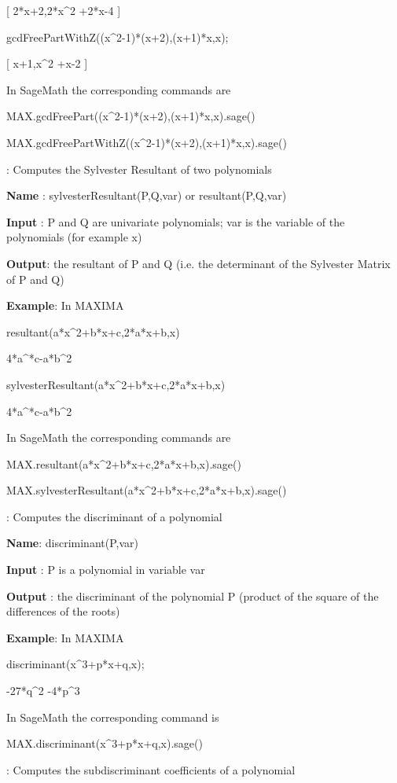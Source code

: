 \documentclass{article}
\begin{document}
   [ 2*x+2,2*x\^{}{2} +2*x-4 ]
   
 gcdFreePartWithZ((x\^{}2-1)*(x+2),(x+1)*x,x);
 
 [ x+1,x\^{}{2} +x-2 ]
  
  \noindent In SageMath the corresponding commands are 
  
  MAX.gcdFreePart((x\^{}2-1)*(x+2),(x+1)*x,x).sage()
  
    MAX.gcdFreePartWithZ((x\^{}2-1)*(x+2),(x+1)*x,x).sage()
  
: Computes the Sylvester Resultant of two polynomials
  
 {\bf Name} : sylvesterResultant(P,Q,var) or
  resultant(P,Q,var)
  
 {\bf Input} : P and Q are univariate polynomials; var is the variable of the polynomials (for example x)
  
  {\bf Output}: the resultant of P and Q (i.e. the determinant of the Sylvester
  Matrix of P and Q)
  
 {\bf Example}: In MAXIMA
 
 resultant(a*x\^{}2+b*x+c,2*a*x+b,x)
    
    4*a\^{}*c-a*b\^{}{2}
  
  sylvesterResultant(a*x\^{}2+b*x+c,2*a*x+b,x)
  
  4*a\^{}*c-a*b\^{}{2}
  
   \noindent In SageMath the corresponding commands are 
  
  MAX.resultant(a*x\^{}2+b*x+c,2*a*x+b,x).sage()
  
    MAX.sylvesterResultant(a*x\^{}2+b*x+c,2*a*x+b,x).sage()
  
:  Computes the discriminant of a polynomial
  
 {\bf Name}: discriminant(P,var)
  
  {\bf Input} : P is a polynomial in variable var
  
  {\bf Output} : the discriminant of the polynomial P (product of the square of the
  differences of the roots)
  
 {\bf Example}: In MAXIMA
 
 discriminant(x\^{}3+p*x+q,x);
 
  -27*q\^{}{2} -4*p\^{}{3}
  
   \noindent In SageMath the corresponding command is 
  
  MAX.discriminant(x\^{}3+p*x+q,x).sage()
  
  
: Computes the subdiscriminant coefficients of a polynomial
  
\end{document}
